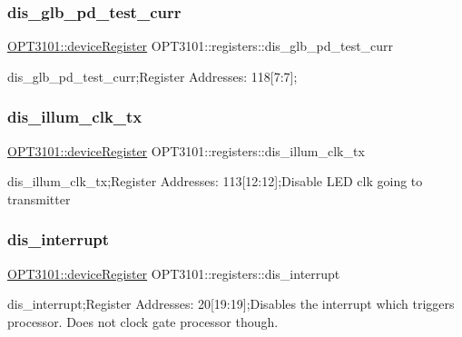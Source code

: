 \subsubsection{\texorpdfstring{dis\+\_\+glb\+\_\+pd\+\_\+test\+\_\+curr}{dis\_glb\_pd\_test\_curr}}
{\footnotesize\ttfamily \mbox{\hyperlink{class_o_p_t3101_1_1device_register}{O\+P\+T3101\+::device\+Register}} O\+P\+T3101\+::registers\+::dis\+\_\+glb\+\_\+pd\+\_\+test\+\_\+curr}



dis\+\_\+glb\+\_\+pd\+\_\+test\+\_\+curr;Register Addresses\+: 118\mbox{[}7\+:7\mbox{]}; 

\mbox{\label{class_o_p_t3101_1_1registers_ac9ceab4db2106751addab3a041dcb858}} 
\subsubsection{\texorpdfstring{dis\+\_\+illum\+\_\+clk\+\_\+tx}{dis\_illum\_clk\_tx}}
{\footnotesize\ttfamily \mbox{\hyperlink{class_o_p_t3101_1_1device_register}{O\+P\+T3101\+::device\+Register}} O\+P\+T3101\+::registers\+::dis\+\_\+illum\+\_\+clk\+\_\+tx}



dis\+\_\+illum\+\_\+clk\+\_\+tx;Register Addresses\+: 113\mbox{[}12\+:12\mbox{]};Disable L\+ED clk going to transmitter 

\mbox{\label{class_o_p_t3101_1_1registers_a2db3e8eb7993d00d2969311c9407e4f0}} 
\subsubsection{\texorpdfstring{dis\+\_\+interrupt}{dis\_interrupt}}
{\footnotesize\ttfamily \mbox{\hyperlink{class_o_p_t3101_1_1device_register}{O\+P\+T3101\+::device\+Register}} O\+P\+T3101\+::registers\+::dis\+\_\+interrupt}



dis\+\_\+interrupt;Register Addresses\+: 20\mbox{[}19\+:19\mbox{]};Disables the interrupt which triggers processor. Does not clock gate processor though. 

